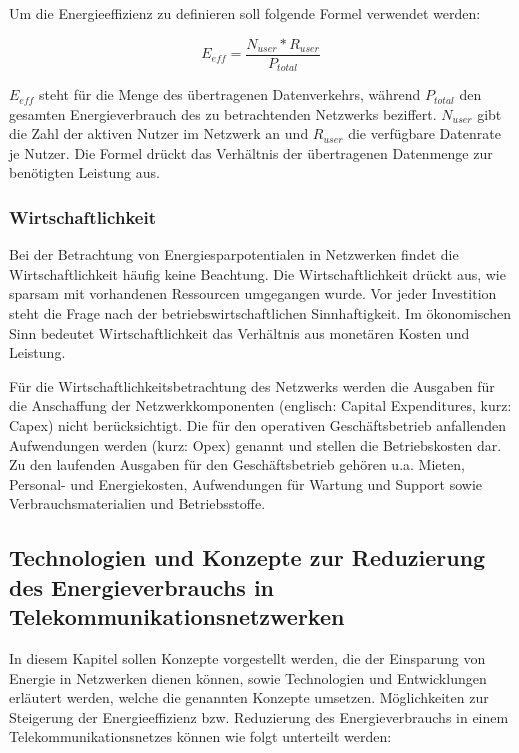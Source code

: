 Um die Energieeffizienz zu definieren soll folgende Formel verwendet werden:

\begin{equation}
E_{eff}=\frac{N_{user}*R_{user}}{P_{total}}
\end{equation}

$E_{eff}$ steht für die Menge des übertragenen Datenverkehrs, während $P_{total}$ den gesamten Energieverbrauch des zu betrachtenden Netzwerks beziffert. $N_{user}$ gibt die Zahl der aktiven Nutzer im Netzwerk an und $R_{user}$ die verfügbare Datenrate je Nutzer. \cite{aleksic2013}
Die Formel drückt das Verhältnis der übertragenen Datenmenge zur benötigten Leistung aus.

\subsubsection{Wirtschaftlichkeit}
Bei der Betrachtung von Energiesparpotentialen in Netzwerken findet die Wirtschaftlichkeit häufig keine Beachtung. Die Wirtschaftlichkeit drückt aus, wie sparsam mit vorhandenen Ressourcen umgegangen wurde.  Vor jeder Investition steht die Frage nach der betriebswirtschaftlichen Sinnhaftigkeit. Im ökonomischen Sinn bedeutet Wirtschaftlichkeit das Verhältnis aus monetären Kosten und Leistung. 

Für die Wirtschaftlichkeitsbetrachtung des Netzwerks werden die Ausgaben für die Anschaffung der Netzwerkkomponenten (englisch: Capital Expenditures, kurz: Capex) nicht be\-rück\-sich\-tigt. Die für den operativen Geschäftsbetrieb anfallenden Aufwendungen werden  (kurz: Opex) genannt und stellen die Betriebskosten dar. Zu den laufenden Ausgaben für den Geschäfts\-betrieb gehören u.a. Mieten, Personal- und Energiekosten, Aufwendungen für Wartung und Support sowie Verbrauchsmaterialien und Betriebsstoffe. 


\subsection{Technologien und Konzepte zur Reduzierung des Energieverbrauchs in Telekommunikationsnetzwerken}
In diesem Kapitel sollen Konzepte vorgestellt werden, die der Einsparung von Energie in Netzwerken dienen können, sowie Technologien und Entwicklungen erläutert werden, welche die genannten Konzepte umsetzen. Möglichkeiten zur Steigerung der Energieeffizienz bzw. Reduzierung des Energieverbrauchs in einem Telekommunikationsnetzes können wie folgt unterteilt werden:

